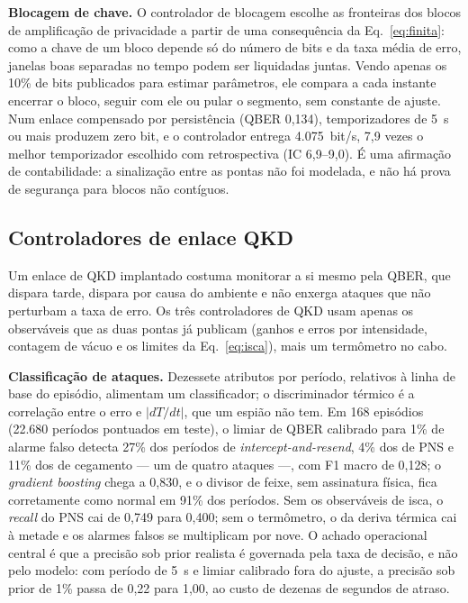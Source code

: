 \documentclass[12pt]{article}
\begin{document}
\label{sec:blocagem}
\textbf{Blocagem de chave.} O controlador de blocagem escolhe as fronteiras dos
blocos de amplificação de privacidade a partir de uma consequência da
Eq.~\ref{eq:finita}: como a chave de um bloco depende só do número de bits e da
taxa média de erro, janelas boas separadas no tempo podem ser liquidadas juntas.
Vendo apenas os 10\% de bits publicados para estimar parâmetros, ele compara a
cada instante encerrar o bloco, seguir com ele ou pular o segmento, sem constante
de ajuste. Num enlace compensado por persistência (QBER 0,134), temporizadores de
5~s ou mais produzem zero bit, e o controlador entrega 4.075~bit/s, 7,9 vezes o
melhor temporizador escolhido com retrospectiva (IC 6,9--9,0). É uma afirmação de
contabilidade: a sinalização entre as pontas não foi modelada, e não há prova de
segurança para blocos não contíguos.

\subsection{Controladores de enlace QKD}
\label{sec:qkd}

Um enlace de QKD implantado costuma monitorar a si mesmo pela QBER, que dispara
tarde, dispara por causa do ambiente e não enxerga ataques que não perturbam a
taxa de erro. Os três controladores de QKD usam apenas os observáveis que as
duas pontas já publicam (ganhos e erros por intensidade, contagem de vácuo e os
limites da Eq.~\ref{eq:isca}), mais um termômetro no cabo.

\label{sec:detector}
\textbf{Classificação de ataques.} Dezessete atributos por período, relativos à
linha de base do episódio, alimentam um classificador; o discriminador térmico é
a correlação entre o erro e $|dT/dt|$, que um espião não tem. Em 168 episódios
(22.680 períodos pontuados em teste), o limiar de QBER calibrado para 1\% de
alarme falso detecta 27\% dos períodos de \textit{intercept-and-resend}, 4\% dos
de PNS e 11\% dos de cegamento --- um de quatro ataques ---, com F1 macro de
0,128; o \textit{gradient boosting} chega a 0,830, e o divisor de feixe, sem
assinatura física, fica corretamente como normal em 91\% dos períodos. Sem os
observáveis de isca, o \textit{recall} do PNS cai de 0,749 para 0,400; sem o
termômetro, o da deriva térmica cai à metade e os alarmes falsos se multiplicam
por nove. O achado operacional central é que a precisão sob prior realista é
governada pela taxa de decisão, e não pelo modelo: com período de 5~s e limiar
calibrado fora do ajuste, a precisão sob prior de 1\% passa de 0,22 para 1,00, ao
custo de dezenas de segundos de atraso.
\end{document}

